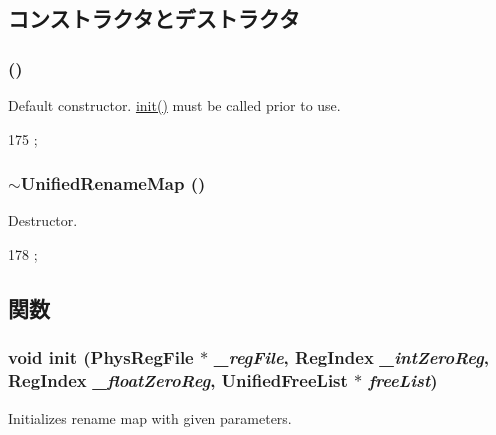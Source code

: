 \subsection{コンストラクタとデストラクタ}
\hypertarget{classUnifiedRenameMap_adb68a513c2ed7c97df59815528f619ba}{
\subsubsection[{UnifiedRenameMap}]{ ()}}
\label{classUnifiedRenameMap_adb68a513c2ed7c97df59815528f619ba}
Default constructor. \hyperlink{classUnifiedRenameMap_a6e4d0eb7c0c24f15b95cbb4b0265f2bd}{init()} must be called prior to use. 


\begin{DoxyCode}
175 {};
\end{DoxyCode}
\hypertarget{classUnifiedRenameMap_a6ee32f6177b3a78b38df48300a3ea20e}{
\subsubsection[{$\sim$UnifiedRenameMap}]{\setlength{\rightskip}{0pt plus 5cm}$\sim${\bf UnifiedRenameMap} ()}}
\label{classUnifiedRenameMap_a6ee32f6177b3a78b38df48300a3ea20e}
Destructor. 


\begin{DoxyCode}
178 {};
\end{DoxyCode}


\subsection{関数}
\hypertarget{classUnifiedRenameMap_a6e4d0eb7c0c24f15b95cbb4b0265f2bd}{
\subsubsection[{init}]{\setlength{\rightskip}{0pt plus 5cm}void init ({\bf PhysRegFile} $\ast$ {\em \_\-regFile}, \/  {\bf RegIndex} {\em \_\-intZeroReg}, \/  {\bf RegIndex} {\em \_\-floatZeroReg}, \/  {\bf UnifiedFreeList} $\ast$ {\em freeList})}}
\label{classUnifiedRenameMap_a6e4d0eb7c0c24f15b95cbb4b0265f2bd}
Initializes rename map with given parameters. 


